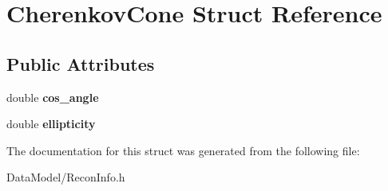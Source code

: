 \hypertarget{structCherenkovCone}{\section{Cherenkov\-Cone Struct Reference}
\label{structCherenkovCone}
}
\subsection*{Public Attributes}
\begin{DoxyCompactItemize}
\item 
\hypertarget{structCherenkovCone_a5dbbcf66d38890fbc33043bbd7f6bb12}{double {\bfseries cos\-\_\-angle}}\label{structCherenkovCone_a5dbbcf66d38890fbc33043bbd7f6bb12}

\item 
\hypertarget{structCherenkovCone_a81685c694d009b2d09a063986a2db932}{double {\bfseries ellipticity}}\label{structCherenkovCone_a81685c694d009b2d09a063986a2db932}

\end{DoxyCompactItemize}


The documentation for this struct was generated from the following file\-:\begin{DoxyCompactItemize}
\item 
Data\-Model/Recon\-Info.\-h\end{DoxyCompactItemize}
